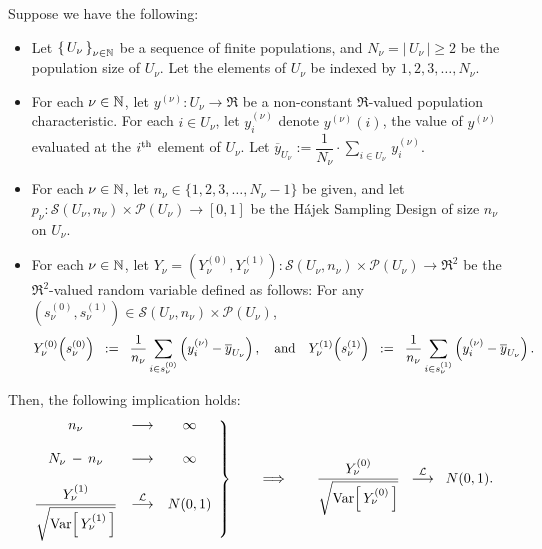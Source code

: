 \begin{corollary}
\label{HajekFundementalLemmaCorollary}
\mbox{}
\vskip 0.1cm
\noindent
Suppose we have the following:
\begin{itemize}

\item Let $\left\{\,U_{\nu}\,\right\}_{\nu \in \mathbb{N}}$ be a sequence of finite populations,
and $N_{\nu} = \left\vert\,U_{\nu}\,\right\vert \geq 2$ be the population size of $U_{\nu}$.
Let the elements of $U_{\nu}$ be indexed by $1,2,3,\ldots,N_{\nu}$.

\item For each $\nu \in \mathbb{N}$, let $y^{(\nu)} : U_{\nu} \longrightarrow \Re$ be a non-constant $\Re$-valued population characteristic.
For each $i \in U_{\nu}$, let $y^{(\nu)}_{i}$ denote $y^{(\nu)}(i)$,
the value of $y^{(\nu)}$ evaluated at the $i^{\textnormal{th}}$ element of $U_{\nu}$.
Let $\overline{y}_{U_{\nu}} := \dfrac{1}{N_{\nu}}\cdot\underset{i\in U_{\nu}}{\sum}\,y^{(\nu)}_{i}$.

\item For each $\nu \in \mathbb{N}$, let $n_{\nu} \in \{ 1,2,3,\ldots,N_{\nu}-1 \}$ be given,
and let $p_{\nu} : \mathcal{S}(U_{\nu},n_{\nu}) \times \mathcal{P}(U_{\nu}) \longrightarrow [0,1]$
be the H\'ajek Sampling Design of size $n_{\nu}$ on $U_{\nu}$.

\item
For each $\nu \in \mathbb{N}$, let 
$Y_{\nu} = \left(Y^{(0)}_{\nu}, Y^{(1)}_{\nu}\right) : \mathcal{S}(U_{\nu},n_{\nu}) \times \mathcal{P}(U_{\nu}) \longrightarrow \Re^{2}$
be the $\Re^{2}$-valued random variable defined as follows:
For any $\left(s^{(0)}_{\nu},s^{(1)}_{\nu}\right) \in \mathcal{S}(U_{\nu},n_{\nu}) \times \mathcal{P}(U_{\nu})$,
\begin{equation*}
Y^{(0)}_{\nu}\!\left(s^{(0)}_{\nu}\right)
\;\; := \;\;
\dfrac{1}{n_{\nu}}\,\underset{i \in s^{(0)}_{\nu}}{\sum} \left(y^{(\nu)}_{i} - \overline{y}_{U_{\nu}}\right),
\quad\textnormal{and}\quad
Y^{(1)}_{\nu}\!\left(s^{(1)}_{\nu}\right)
\;\; := \;\;
\dfrac{1}{n_{\nu}}\,\underset{i \in s^{(1)}_{\nu}}{\sum} \left(y^{(\nu)}_{i} - \overline{y}_{U_{\nu}}\right).
\end{equation*}
\end{itemize}
Then, the following implication holds:
\begin{equation*}
\left.\begin{array}{ccc}
n_{\nu} &\longrightarrow & \infty \\ \\
N_{\nu} \, - \, n_{\nu} &\longrightarrow & \infty \\ \\
\dfrac{Y^{(1)}_{\nu}}{\sqrt{\textnormal{Var}\!\left[\,Y^{(1)}_{\nu}\,\right]}} & \overset{\mathcal{L}}{\longrightarrow} & N(0,1)
\end{array}\right\}
\quad\quad\Longrightarrow\quad\quad
\dfrac{Y^{(0)}_{\nu}}{\sqrt{\textnormal{Var}\!\left[\,Y^{(0)}_{\nu}\,\right]}} \;\; \overset{\mathcal{L}}{\longrightarrow} \;\; N(0,1).
\end{equation*}
\end{corollary}

